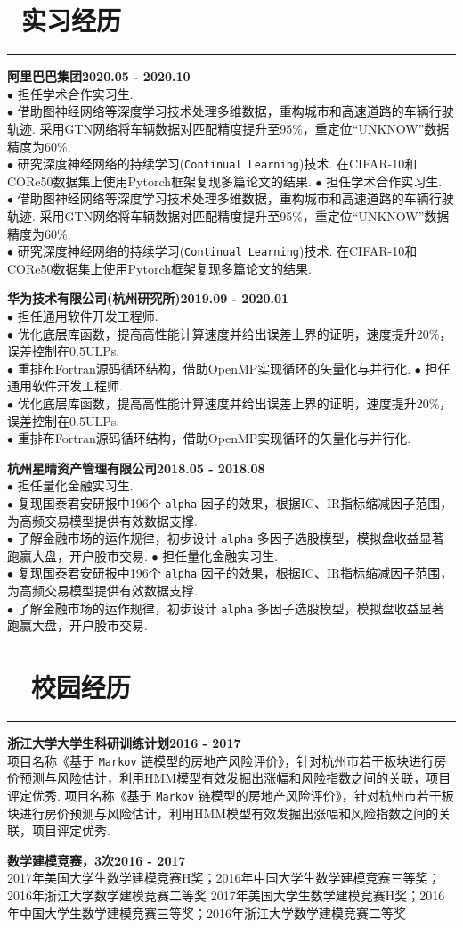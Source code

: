\documentclass[a4paper, 11pt]{ctexart}
\newcommand{\CVitemA}[3]
{
	\textbf{{\kaishu#1}\hfill {\color{gray}#2} }  \\
	\ifx #3
	\else
	\small\fangsong #3\vspace{\parsep}
	\\[-2.0ex]
	\fi 
}
\begin{document}
\begin{multicols}{2}
\vspace{-.5cm}

\section*{\faUsers ~实习经历} \vspace{-0.25cm}\hrule	
\CVitemA
{阿里巴巴集团}{2020.05 - 2020.10}
{ $\bullet$ 担任学术合作实习生. \\
  $\bullet$ 借助图神经网络等深度学习技术处理多维数据，重构城市和高速道路的车辆行驶轨迹. 采用GTN网络将车辆数据对匹配精度提升至95\%，重定位“UNKNOW”数据精度为60\%.\\
  $\bullet$  研究深度神经网络的持续学习(\texttt{Continual Learning})技术. 在CIFAR-10和CORe50数据集上使用Pytorch框架复现多篇论文的结果.}
\CVitemA
{华为技术有限公司(杭州研究所)}{2019.09 - 2020.01}
{ $\bullet$ 担任通用软件开发工程师.\\
  $\bullet$ 优化底层库函数，提高高性能计算速度并给出误差上界的证明，速度提升20\%，误差控制在0.5ULPs.\\
  $\bullet$ 重排布Fortran源码循环结构，借助OpenMP实现循环的矢量化与并行化.}
\CVitemA
{杭州星晴资产管理有限公司}{2018.05 - 2018.08}
{ $\bullet$ 担任量化金融实习生.\\
  $\bullet$ 复现国泰君安研报中196个 \texttt{alpha} 因子的效果，根据IC、IR指标缩减因子范围，为高频交易模型提供有效数据支撑.\\
  $\bullet$ 了解金融市场的运作规律，初步设计 \texttt{alpha} 多因子选股模型，模拟盘收益显著跑赢大盘，开户股市交易.}


\vspace{-.5cm}
\section*{\faUniversity~ 校园经历} \vspace{-0.25cm}\hrule
\CVitemA{浙江大学大学生科研训练计划}{2016 - 2017}
{项目名称《基于 \texttt{Markov} 链模型的房地产风险评价》，针对杭州市若干板块进行房价预测与风险估计，利用HMM模型有效发掘出涨幅和风险指数之间的关联，项目评定优秀.}
\CVitemA
{数学建模竞赛，3次}{2016 - 2017}
{2017年美国大学生数学建模竞赛H奖；2016年中国大学生数学建模竞赛三等奖；2016年浙江大学数学建模竞赛二等奖}


\end{multicols}
\end{document}
